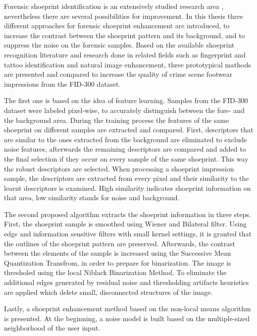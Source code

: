 \documentclass[draft,final]{vutinfth} %
\begin{document}
\par
Forensic shoeprint identification is an extensively studied research area \cite{rida2019forensic}, nevertheless there are several possibilities for improvement.
In this thesis three different approaches for forensic shoeprint enhancement are introduced, to increase the contrast between the shoeprint pattern and its background, and to suppress the noise on the forensic samples.
Based on the available shoeprint recognition literature and research done in related fields such as fingerprint and tattoo identification and natural image enhancement, three prototypical mathods are presented and compared to increase the quality of crime scene footwear impressions from the FID-300 dataset.
\par
The first one is based on the idea of feature learning.
Samples from the FID-300 dataset were labeled pixel-wise, to accurately distinguish between the fore- and the background area.
During the training process the features of the same shoeprint on different samples are extracted and compared.
First, descriptors that are similar to the ones extracted from the background are eliminated to exclude noise features, afterwards the remaining descriptors are compared and added to the final selection if they occur on every sample of the same shoeprint.
This way the robust descriptors are selected.
When processing a shoeprint impression sample, the descriptors are extracted from every pixel and their similarity to the learnt descriptors is examined.
High similarity indicates shoeprint information on that area, low similarity stands for noise and background.
\par
The second proposed algorithm extracts the shoeprint information in three steps.
First, the shoeprint sample is smoothed using Wiener and Bilateral filter.
Using edge and information sensitive filters with small kernel settings, it is granted that the outlines of the shoeprint pattern are preserved.
Afterwards, the contrast between the elements of the sample is increased using the Successive Mean Quantization Transfrom, in order to prepare for binarization.
The image is thresholed using the local Niblack Binarization Method.
To eliminate the additional edges generated by residual noise and thresholding artifacts heuristics are applied which delete small, disconnected structures of the image.
\par
Lastly, a shoeprint enhancement method based on the non-local means algorithm is presented.
At the beginning, a noise model is built based on the multiple-sized neighborhood of the user input.
\end{document}
